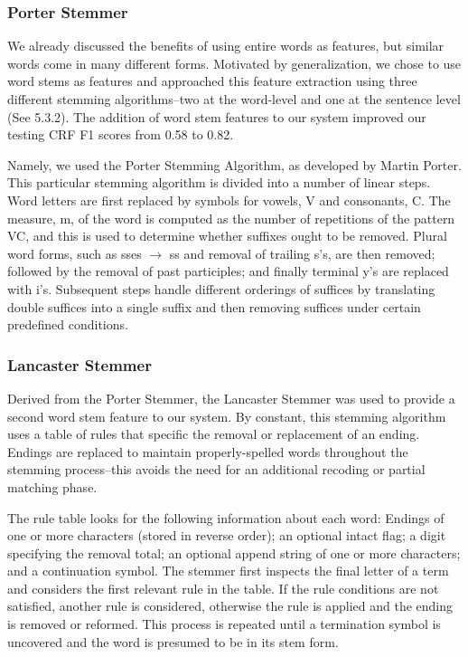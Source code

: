 \documentclass[preprint]{style}
\begin{document}
\subsubsection{Porter Stemmer}
We already discussed the benefits of using entire words as features, but similar words come in many different forms. Motivated by generalization, we chose to use word stems as features and approached this feature extraction using three different stemming algorithms--two at the word-level and one at the sentence level (See 5.3.2). The addition of word stem features to our system improved our testing CRF F1 scores from 0.58 to 0.82.

Namely, we used the Porter Stemming Algorithm, as developed by Martin Porter.  This particular stemming algorithm is divided into a number of linear steps. Word letters are first replaced by symbols for vowels, V and consonants, C. The measure, m, of the word is computed as the number of repetitions of the pattern VC, and this is used to determine whether suffixes ought to be removed. Plural word forms, such as  sses $\rightarrow$ ss and removal of trailing s's, are then removed; followed by the removal of past participles; and finally terminal y's are replaced with i's. Subsequent steps handle different orderings of suffices by translating double suffices into a single suffix and then removing suffices under certain predefined conditions.

\subsubsection{Lancaster Stemmer}

Derived from the Porter Stemmer, the Lancaster Stemmer was used to provide a second word stem feature to our system. By constant, this stemming algorithm uses a table of rules that specific the removal or replacement of an ending. Endings are replaced to maintain properly-spelled words throughout the stemming process--this avoids the need for an additional recoding or partial matching phase. 

The rule table looks for the following information about each word: Endings of one or more characters (stored in reverse order); an optional intact flag; a digit specifying the removal total;  an optional append string of one or more characters;  and a continuation symbol. The stemmer first inspects the final letter of a term and considers the first relevant rule in the table. If the rule conditions are not satisfied, another rule is considered, otherwise the rule is applied and the ending is removed or reformed. This process is repeated until a termination symbol is uncovered and the word is presumed to be in its stem form.
\end{document}
